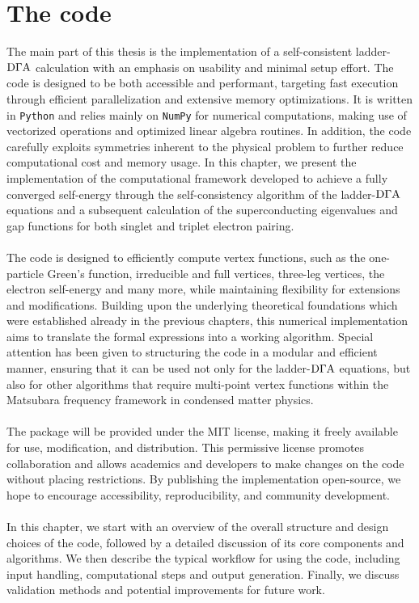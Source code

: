 \documentclass[../../main.tex]{subfiles}
\begin{document}
\sloppy

\chapter{The code}

The main part of this thesis is the implementation of a self-consistent ladder-$\text{D}\Gamma\text{A}$ calculation with an emphasis on usability and minimal setup effort. The code is designed to be both accessible and performant, targeting fast execution through efficient parallelization and extensive memory optimizations. It is written in \texttt{Python} and relies mainly on \texttt{NumPy} for numerical computations, making use of vectorized operations and optimized linear algebra routines. In addition, the code carefully exploits symmetries inherent to the physical problem to further reduce computational cost and memory usage. In this chapter, we present the implementation of the computational framework developed to achieve a fully converged self-energy through the self-consistency algorithm of the ladder-$\text{D}\Gamma\text{A}$ equations and a subsequent calculation of the superconducting eigenvalues and gap functions for both singlet and triplet electron pairing. 
\\\\
The code is designed to efficiently compute vertex functions, such as the one-particle Green's function, irreducible and full vertices, three-leg vertices, the electron self-energy and many more, while maintaining flexibility for extensions and modifications. Building upon the underlying theoretical foundations which were established already in the previous chapters, this numerical implementation aims to translate the formal expressions into a working algorithm. Special attention has been given to structuring the code in a modular and efficient manner, ensuring that it can be used not only for the ladder-$\text{D}\Gamma\text{A}$ equations, but also for other algorithms that require multi-point vertex functions within the Matsubara frequency framework in condensed matter physics.
\\\\
The package will be provided under the MIT license, making it freely available for use, modification, and distribution. This permissive license promotes collaboration and allows academics and developers to make changes on the code without placing restrictions. By publishing the implementation open-source, we hope to encourage accessibility, reproducibility, and community development.
\\\\
In this chapter, we start with an overview of the overall structure and design choices of the code, followed by a detailed discussion of its core components and algorithms. We then describe the typical workflow for using the code, including input handling, computational steps and output generation. Finally, we discuss validation methods and potential improvements for future work.
\end{document}
